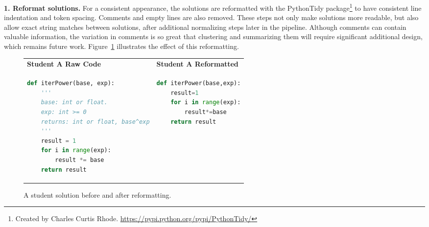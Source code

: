 {\bf 1. Reformat solutions.} For a consistent appearance, the solutions are reformatted with the PythonTidy package\footnote{Created by Charles Curtis Rhode. \url{https://pypi.python.org/pypi/PythonTidy/}} to have consistent line indentation and token spacing. Comments and empty lines are also removed. These steps not only make solutions more readable, but also allow exact string matches between solutions, after additional normalizing steps later in the pipeline. Although comments can contain valuable information, the variation in comments is so great that clustering and summarizing them will require significant additional design, which remains future work. Figure~\ref{fig:reformat} illustrates the effect of this reformatting.
\begin{figure}
\begin{tabular}{ll}
{\bf Student A Raw Code} & {\bf Student A Reformatted} \\
\begin{minipage}{0.5\linewidth}
\begin{lstlisting}[basicstyle=\linespread{1.0}\ttfamily\footnotesize,language=python]
def iterPower(base, exp):
    '''
    base: int or float.
    exp: int >= 0
    returns: int or float, base^exp
    '''
    result = 1
    for i in range(exp):
        result *= base
    return result
\end{lstlisting}
\end{minipage}
&
\begin{minipage}{0.5\linewidth}
\begin{lstlisting}[basicstyle=\linespread{1.0}\ttfamily\footnotesize,language=python]
def iterPower(base,exp):
    result=1
    for i in range(exp):
        result*=base
    return result
\end{lstlisting}
\end{minipage}
\end{tabular}
\caption{A student solution before and after reformatting.}
\label{fig:reformat}
\end{figure}

